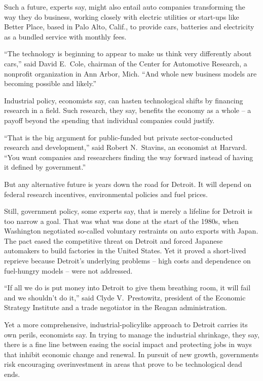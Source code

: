 \documentclass[12pt,a4paper,onecolumn]{article}
\begin{document}
Such a future, experts say, might also entail auto companies transforming the way they do business,
working closely with electric utilities or start-ups like Better Place, based in Palo Alto, Calif.,
to provide cars, batteries and electricity as a bundled service with monthly fees.

``The technology is beginning to appear to make us think very differently about cars,'' said David
E.~Cole, chairman of the Center for Automotive Research, a nonprofit organization in Ann Arbor,
Mich. ``And whole new business models are becoming possible and likely.''

Industrial policy, economists say, can hasten technological shifts by financing research in a field.
Such research, they say, benefits the economy as a whole -- a payoff beyond the spending that
individual companies could justify.

``That is the big argument for public-funded but private sector-conducted research and
development,'' said Robert N.~Stavins, an economist at Harvard. ``You want companies and researchers
finding the way forward instead of having it defined by government.''

But any alternative future is years down the road for Detroit. It will depend on federal research
incentives, environmental policies and fuel prices.

Still, government policy, some experts say, that is merely a lifeline for Detroit is too narrow a
goal. That was what was done at the start of the 1980s, when Washington negotiated so-called
voluntary restraints on auto exports with Japan. The pact eased the competitive threat on Detroit
and forced Japanese automakers to build factories in the United States. Yet it proved a short-lived
reprieve because Detroit's underlying problems -- high costs and dependence on fuel-hungry models --
were not addressed.

``If all we do is put money into Detroit to give them breathing room, it will fail and we shouldn't
do it,'' said Clyde V.~Prestowitz, president of the Economic Strategy Institute and a trade
negotiator in the Reagan administration.

Yet a more comprehensive, industrial-policylike approach to Detroit carries its own perils,
economists say. In trying to manage the industrial shrinkage, they say, there is a fine line between
easing the social impact and protecting jobs in ways that inhibit economic change and renewal. In
pursuit of new growth, governments risk encouraging overinvestment in areas that prove to be
technological dead ends.
\end{document}
